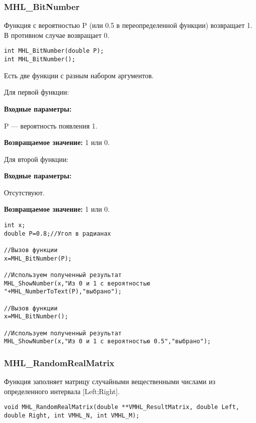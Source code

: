 \documentclass[a4paper,12pt]{article}
\begin{document}
\subsubsection{MHL\_BitNumber}\label{MHL_BitNumber}

Функция с вероятностью P (или 0.5 в переопределенной функции) возвращает 1. В противном случае возвращает 0.


\begin{lstlisting}[label=code_syntax_MHL_BitNumber,caption=Синтаксис]
int MHL_BitNumber(double P);
int MHL_BitNumber();
\end{lstlisting}

Есть две функции с разным набором аргументов.

Для первой функции:

\textbf{Входные параметры:}

 P --- вероятность появления 1.

\textbf{Возвращаемое значение:}
1 или 0.

Для второй функции:

\textbf{Входные параметры:}

 Отсутствуют.

\textbf{Возвращаемое значение:}
1 или 0.


\begin{lstlisting}[label=code_use_MHL_BitNumber,caption=Пример использования]
int x;
double P=0.8;//Угол в радианах

//Вызов функции
x=MHL_BitNumber(P);

//Используем полученный результат
MHL_ShowNumber(x,"Из 0 и 1 с вероятностью "+MHL_NumberToText(P),"выбрано");

//Вызов функции
x=MHL_BitNumber();

//Используем полученный результат
MHL_ShowNumber(x,"Из 0 и 1 с вероятностью 0.5","выбрано");
\end{lstlisting}

\subsubsection{MHL\_RandomRealMatrix}\label{MHL_RandomRealMatrix}

Функция заполняет матрицу случайными вещественными числами из определенного интервала [Left;Right].


\begin{lstlisting}[label=code_syntax_MHL_RandomRealMatrix,caption=Синтаксис]
void MHL_RandomRealMatrix(double **VMHL_ResultMatrix, double Left, double Right, int VMHL_N, int VMHL_M);
\end{lstlisting}
\end{document}
